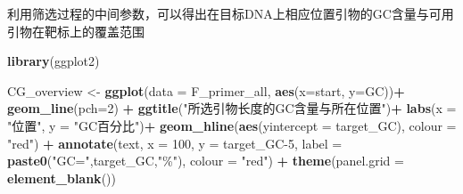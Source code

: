 \documentclass[
]{article}
\newenvironment{Shaded}{\begin{snugshade}}{\end{snugshade}}
\newcommand{\AttributeTok}[1]{\textcolor[rgb]{0.13,0.29,0.53}{#1}}
\newcommand{\DecValTok}[1]{\textcolor[rgb]{0.00,0.00,0.81}{#1}}
\newcommand{\FunctionTok}[1]{\textcolor[rgb]{0.13,0.29,0.53}{\textbf{#1}}}
\newcommand{\NormalTok}[1]{#1}
\newcommand{\OtherTok}[1]{\textcolor[rgb]{0.56,0.35,0.01}{#1}}
\newcommand{\SpecialCharTok}[1]{\textcolor[rgb]{0.81,0.36,0.00}{\textbf{#1}}}
\newcommand{\StringTok}[1]{\textcolor[rgb]{0.31,0.60,0.02}{#1}}
\begin{document}
利用筛选过程的中间参数，可以得出在目标DNA上相应位置引物的GC含量与可用引物在靶标上的覆盖范围

\begin{Shaded}
\begin{Highlighting}[]
\FunctionTok{library}\NormalTok{(ggplot2)}

\NormalTok{CG\_overview }\OtherTok{\textless{}{-}} 
  \FunctionTok{ggplot}\NormalTok{(}\AttributeTok{data =}\NormalTok{ F\_primer\_all, }\FunctionTok{aes}\NormalTok{(}\AttributeTok{x=}\NormalTok{start, }\AttributeTok{y=}\NormalTok{GC))}\SpecialCharTok{+}
  \FunctionTok{geom\_line}\NormalTok{(}\AttributeTok{pch=}\DecValTok{2}\NormalTok{) }\SpecialCharTok{+}
  \FunctionTok{ggtitle}\NormalTok{(}\StringTok{"所选引物长度的GC含量与所在位置"}\NormalTok{)}\SpecialCharTok{+}
  \FunctionTok{labs}\NormalTok{(}\AttributeTok{x =} \StringTok{"位置"}\NormalTok{, }\AttributeTok{y =} \StringTok{"GC百分比"}\NormalTok{)}\SpecialCharTok{+}
  \FunctionTok{geom\_hline}\NormalTok{(}\FunctionTok{aes}\NormalTok{(}\AttributeTok{yintercept =}\NormalTok{ target\_GC), }\AttributeTok{colour =} \StringTok{"red"}\NormalTok{) }\SpecialCharTok{+}
  \FunctionTok{annotate}\NormalTok{(}\StringTok{\textquotesingle{}text\textquotesingle{}}\NormalTok{, }\AttributeTok{x =} \DecValTok{100}\NormalTok{, }\AttributeTok{y =}\NormalTok{ target\_GC}\DecValTok{{-}5}\NormalTok{, }\AttributeTok{label =} \FunctionTok{paste0}\NormalTok{(}\StringTok{"GC="}\NormalTok{,target\_GC,}\StringTok{"\%"}\NormalTok{), }\AttributeTok{colour =} \StringTok{"red"}\NormalTok{) }\SpecialCharTok{+}
  \FunctionTok{theme}\NormalTok{(}\AttributeTok{panel.grid =} \FunctionTok{element\_blank}\NormalTok{())}


\end{Highlighting}
\end{Shaded}
\end{document}

